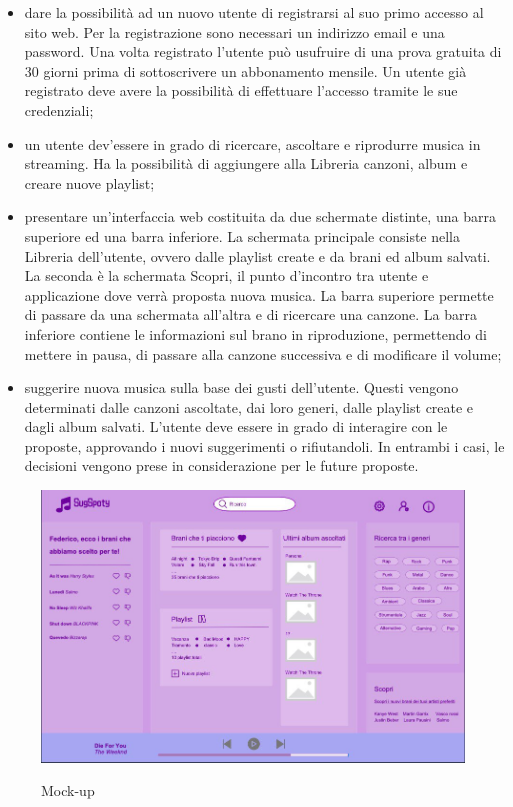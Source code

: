 \documentclass[a4paper,12pt]{article}
\begin{document}
\begin{itemize}
    \item dare la possibilità ad un nuovo utente di registrarsi al suo primo accesso al sito web. Per la registrazione sono necessari un indirizzo email e una password. Una volta registrato l’utente può usufruire di una prova gratuita di 30 giorni prima di sottoscrivere un abbonamento  mensile. Un utente già registrato deve avere la possibilità di effettuare l’accesso tramite le sue credenziali;
    \item un utente dev’essere in grado di ricercare, ascoltare e riprodurre musica in streaming. Ha la possibilità di aggiungere alla Libreria canzoni, album e creare nuove playlist;
    \item presentare un’interfaccia web costituita da due schermate distinte, una barra superiore ed una barra inferiore. La schermata principale consiste nella Libreria dell’utente, ovvero dalle playlist create e da brani ed album salvati. La seconda è la schermata Scopri, il punto d’incontro tra utente e applicazione dove verrà proposta nuova musica. La barra superiore permette di passare da una schermata all’altra e di ricercare una canzone. La barra inferiore contiene le informazioni sul brano in riproduzione, permettendo di mettere in pausa, di passare alla canzone successiva e di modificare il volume;
    \item suggerire nuova musica sulla base dei gusti dell’utente. Questi vengono determinati dalle canzoni ascoltate, dai loro generi, dalle playlist create e dagli album salvati. L’utente deve essere in grado di interagire con le proposte, approvando i nuovi suggerimenti o rifiutandoli. In entrambi i casi, le decisioni vengono prese in considerazione per le future proposte.
\end{itemize}

\begin{figure}
    \centering
    \includegraphics[width=\textwidth]{mock-up.jpg}
    \label{fig:mock-up}
    \caption{Mock-up}
\end{figure}
\end{document}

